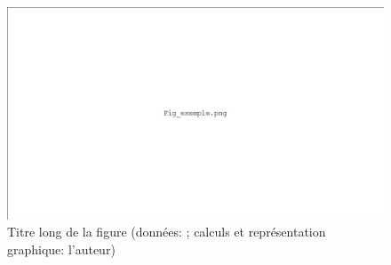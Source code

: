 \begin{figure}
\includegraphics[width=\textwidth]{pictures/fig_exemple.png}
\caption[Titre court de la figure]{Titre long de la figure (données: ; calculs et représentation graphique: l'auteur)}\label{fig:exemple}
\end{figure}

\lipsum[10]

\lipsum[11]

\lipsum[12]

\lipsum[13]

\lipsum[14]

\lipsum[15]

